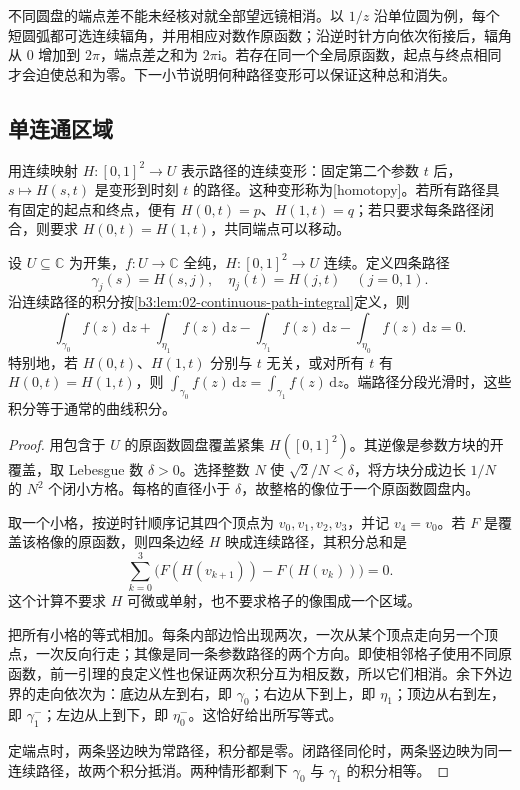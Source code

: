 \ProseParagraphBreak

不同圆盘的端点差不能未经核对就全部望远镜相消。以 \(1/z\) 沿单位圆为例，每个短圆弧都可选连续辐角，并用相应对数作原函数；沿逆时针方向依次衔接后，辐角从 \(0\) 增加到 \(2\pi\)，端点差之和为 \(2\pi\mathrm{i}\)。若存在同一个全局原函数，起点与终点相同才会迫使总和为零。下一小节说明何种路径变形可以保证这种总和消失。

\subsection{单连通区域}
\label{b3:subsec:020203}

用连续映射 \(H:[0,1]^2\to U\) 表示路径的连续变形：固定第二个参数 \(t\) 后，\(s\mapsto H(s,t)\) 是变形到时刻 \(t\) 的路径。这种变形称为[homotopy]。若所有路径具有固定的起点和终点，便有 \(H(0,t)=p\)、\(H(1,t)=q\)；若只要求每条路径闭合，则要求 \(H(0,t)=H(1,t)\)，共同端点可以移动。

\begin{proposition}[同伦下的积分不变性]\label{b3:prop:02-homotopy-invariance}
设 \(U\subseteq\mathbb C\) 为开集，\(f:U\to\mathbb C\) 全纯，\(H:[0,1]^2\to U\) 连续。定义四条路径
\[
 \gamma_j(s)=H(s,j),
 \quad \eta_j(t)=H(j,t)
 \quad(j=0,1).
\]
沿连续路径的积分按\cref{b3:lem:02-continuous-path-integral}定义，则
\[
 \int_{\gamma_0}f(z)\,\mathrm{d}z
 +\int_{\eta_1}f(z)\,\mathrm{d}z
 -\int_{\gamma_1}f(z)\,\mathrm{d}z
 -\int_{\eta_0}f(z)\,\mathrm{d}z=0.
\]
特别地，若 \(H(0,t)\)、\(H(1,t)\) 分别与 \(t\) 无关，或对所有 \(t\) 有 \(H(0,t)=H(1,t)\)，则
\(\int_{\gamma_0}f(z)\,\mathrm{d}z=\int_{\gamma_1}f(z)\,\mathrm{d}z\)。端路径分段光滑时，这些积分等于通常的曲线积分。
\end{proposition}
\begin{proof}
用包含于 \(U\) 的原函数圆盘覆盖紧集 \(H([0,1]^2)\)。其逆像是参数方块的开覆盖，取 Lebesgue 数 \(\delta>0\)。选择整数 \(N\) 使 \(\sqrt2/N<\delta\)，将方块分成边长 \(1/N\) 的 \(N^2\) 个闭小方格。每格的直径小于 \(\delta\)，故整格的像位于一个原函数圆盘内。

取一个小格，按逆时针顺序记其四个顶点为 \(v_0,v_1,v_2,v_3\)，并记 \(v_4=v_0\)。若 \(F\) 是覆盖该格像的原函数，则四条边经 \(H\) 映成连续路径，其积分总和是
\[
 \sum_{k=0}^3\bigl(F(H(v_{k+1}))-F(H(v_k))\bigr)=0.
\]
这个计算不要求 \(H\) 可微或单射，也不要求格子的像围成一个区域。

把所有小格的等式相加。每条内部边恰出现两次，一次从某个顶点走向另一个顶点，一次反向行走；其像是同一条参数路径的两个方向。即使相邻格子使用不同原函数，前一引理的良定义性也保证两次积分互为相反数，所以它们相消。余下外边界的走向依次为：底边从左到右，即 \(\gamma_0\)；右边从下到上，即 \(\eta_1\)；顶边从右到左，即 \(\gamma_1^-\)；左边从上到下，即 \(\eta_0^-\)。这恰好给出所写等式。

定端点时，两条竖边映为常路径，积分都是零。闭路径同伦时，两条竖边映为同一连续路径，故两个积分抵消。两种情形都剩下 \(\gamma_0\) 与 \(\gamma_1\) 的积分相等。
\end{proof}

